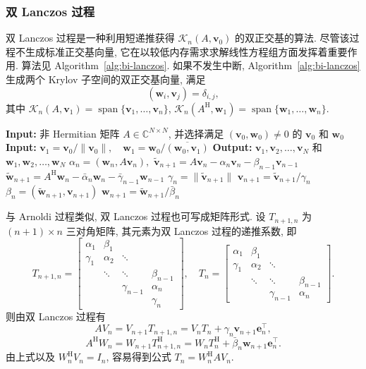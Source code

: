 \subsubsection{{双 Lanczos 过程}}\label{subsec:bi-lanczos-process}\label{srcpage:printed-26}
{双 Lanczos 过程是一种利用短递推获得 $\mathcal K_n(A,\bm v_0)$ 的双正交基的算法. 尽管该过程不生成标准正交基向量, 它在以较低内存需求求解线性方程组方面发挥着重要作用. 算法见 Algorithm~\ref{alg:bi-lanczos}.}
{如果不发生中断, Algorithm~\ref{alg:bi-lanczos} 生成两个 Krylov 子空间的双正交基向量, 满足}
\[(\bm w_i,\bm v_j)=\delta_{i,j},\]
{其中 $\mathcal K_n(A,\bm v_1)=\operatorname{span}\{\bm v_1,\ldots,\bm v_n\}$, $\mathcal K_n(A^{\mathrm H},\bm w_1)=\operatorname{span}\{\bm w_1,\ldots,\bm w_n\}$.}
\begin{algorithm}[H]\caption{{双 Lanczos 过程}}\label{alg:bi-lanczos}\label{srcpage:printed-27}
\begin{algorithmic}[1]
\Statex\textbf{Input:} {非 Hermitian 矩阵 $A\in\mathbb C^{N\times N}$, 并选择满足 $(\bm v_0,\bm w_0)\ne0$ 的 $\bm v_0$ 和 $\bm w_0$}
\Statex\textbf{Input:} $\bm v_1=\bm v_0/\|\bm v_0\|,\quad\bm w_1=\bm w_0/\overline{(\bm w_0,\bm v_1)}$
\Statex\textbf{Output:} $\bm v_1,\bm v_2,\ldots,\bm v_N$ {和} $\bm w_1,\bm w_2,\ldots,\bm w_N$
\State $\alpha_n=(\bm w_n,A\bm v_n),$
\State $\tilde{\bm v}_{n+1}=A\bm v_n-\alpha_n\bm v_n-\beta_{n-1}\bm v_{n-1}$
\State $\tilde{\bm w}_{n+1}=A^{\mathrm H}\bm w_n-\bar\alpha_n\bm w_n-\bar\gamma_{n-1}\bm w_{n-1}$
\State $\gamma_n=\|\tilde{\bm v}_{n+1}\|$
\State $\bm v_{n+1}=\tilde{\bm v}_{n+1}/\gamma_n$
\State $\beta_n=(\tilde{\bm w}_{n+1},\bm v_{n+1})$
\State $\bm w_{n+1}=\tilde{\bm w}_{n+1}/\bar\beta_n$
\EndFor
\end{algorithmic}\end{algorithm}
{与 Arnoldi 过程类似, 双 Lanczos 过程也可写成矩阵形式. 设 $T_{n+1,n}$ 为 $(n+1)\times n$ 三对角矩阵, 其元素为双 Lanczos 过程的递推系数, 即}
\[
T_{n+1,n}=\begin{bmatrix}
\alpha_1&\beta_1&&\\
\gamma_1&\alpha_2&\ddots&\\
&\ddots&\ddots&\beta_{n-1}\\
&&\gamma_{n-1}&\alpha_n\\
&&&\gamma_n
\end{bmatrix},\quad
T_n=\begin{bmatrix}
\alpha_1&\beta_1&&\\
\gamma_1&\alpha_2&\ddots&\\
&\ddots&\ddots&\beta_{n-1}\\
&&\gamma_{n-1}&\alpha_n
\end{bmatrix}.
\]
{则由双 Lanczos 过程有}
\begin{equation}\label{eq:bilanczos-matrix-relation}
AV_n=V_{n+1}T_{n+1,n}=V_nT_n+\gamma_n\bm v_{n+1}\bm e_n^\top,
\end{equation}
\[
A^{\mathrm H}W_n=W_{n+1}T_{n+1,n}^{\mathrm H}
=W_nT_n^{\mathrm H}+\bar\beta_n\bm w_{n+1}\bm e_n^\top.
\]
{由上式以及 $W_n^{\mathrm H}V_n=I_n$, 容易得到公式 $T_n=W_n^{\mathrm H}AV_n$.}
